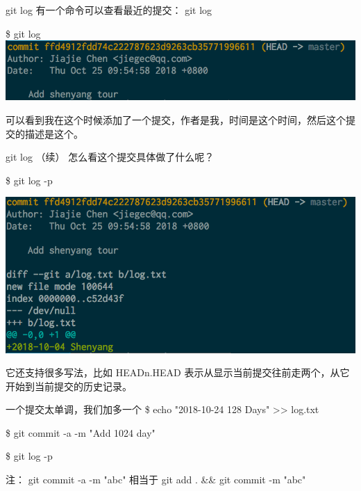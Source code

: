 \documentclass{beamer}
\begin{document}
\begin{frame}{git log}
    有一个命令可以查看最近的提交： git log

    \$ git log
    \includegraphics[width=\linewidth]{2018-10-25-09-59-01.png}

    可以看到我在这个时候添加了一个提交，作者是我，时间是这个时间，然后这个提交的描述是这个。

\end{frame}
\begin{frame}{git log （续）}
    怎么看这个提交具体做了什么呢？

    \$ git log -p

    \includegraphics[width=\linewidth]{2018-10-25-10-01-41.png}

    它还支持很多写法，比如 HEAD^^..HEAD 表示从显示当前提交往前走两个，从它开始到当前提交的历史记录。
\end{frame}

\begin{frame}{一个提交太单调，我们加多一个}
    \$ echo "2018-10-24 128 Days" >{}> log.txt

    \$ git commit -a -m "Add 1024 day"

    \$ git log -p

    注： git commit -a -m "abc" 相当于 git add . \&\& git commit -m "abc"

\end{frame}
\end{document}

